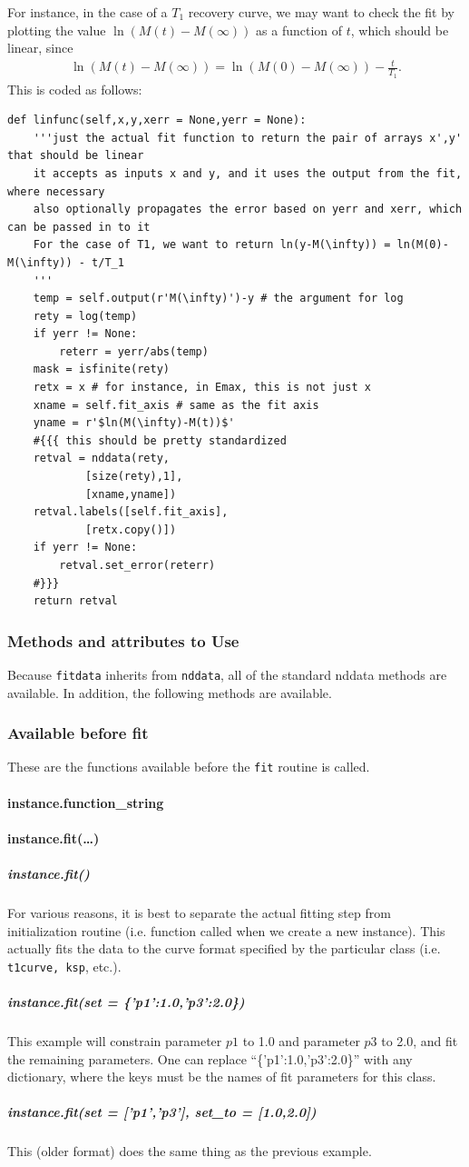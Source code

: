 For instance, in the case of a $T_1$ recovery curve,
    we may want to check the fit by
    plotting the value $\ln(M(t)-M(\infty))$
    as a function of $t$, which should be linear,
    since
    \begin{align}
        \ln(M(t)-M(\infty)) = \ln(M(0)-M(\infty)) - \frac{t}{T_1}
        .
    \end{align}
This is coded as follows:
\begin{lstlisting}
def linfunc(self,x,y,xerr = None,yerr = None):
    '''just the actual fit function to return the pair of arrays x',y' that should be linear
    it accepts as inputs x and y, and it uses the output from the fit, where necessary
    also optionally propagates the error based on yerr and xerr, which can be passed in to it
    For the case of T1, we want to return ln(y-M(\infty)) = ln(M(0)-M(\infty)) - t/T_1
    '''
    temp = self.output(r'M(\infty)')-y # the argument for log
    rety = log(temp)
    if yerr != None:
        reterr = yerr/abs(temp)
    mask = isfinite(rety)
    retx = x # for instance, in Emax, this is not just x
    xname = self.fit_axis # same as the fit axis
    yname = r'$ln(M(\infty)-M(t))$'
    #{{{ this should be pretty standardized
    retval = nddata(rety,
            [size(rety),1],
            [xname,yname])
    retval.labels([self.fit_axis],
            [retx.copy()])
    if yerr != None:
        retval.set_error(reterr)
    #}}}
    return retval
\end{lstlisting}
\subsubsection{Methods and attributes to Use}
Because {\tt fitdata} inherits from {\tt nddata},
    all of the standard nddata methods are available.
In addition, the following methods are available.
\subsubsection{Available before fit}
These are the functions available before the {\tt fit}
    routine is called.
\paragraph{instance.function\_string}
\paragraph{instance.fit(\ldots)}
\subparagraph{instance.fit()}
For various reasons, it is best to separate
    the actual fitting step from initialization
    routine (i.e. function called when we create
    a new instance).
This actually fits the data to the curve format
    specified by the particular class (i.e. {\tt t1curve, ksp}, etc.).
\subparagraph{instance.fit(set = \{'p1':1.0,'p3':2.0\})}
This example will constrain parameter $p1$ to 1.0 and parameter $p3$ to 2.0,
    and fit the remaining parameters.
One can replace ``\{'p1':1.0,'p3':2.0\}''
    with any dictionary, where the keys must be the names
    of fit parameters for this class.
\subparagraph{instance.fit(set = ['p1','p3'], set\_to = [1.0,2.0])}
This (older format) does the same thing as the previous example.

